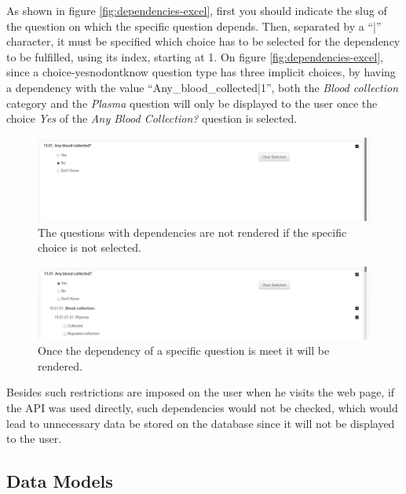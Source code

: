 As shown in figure \ref{fig:dependencies-excel}, first you should indicate the slug of the question on which the specific question depends.
Then, separated by a ``|'' character, it must be specified which choice has to be selected for the dependency to be fulfilled, using its index, starting at 1.
On figure \ref{fig:dependencies-excel}, since a choice-yesnodontknow question type has three implicit choices, by having a dependency with the value ``Any\_blood\_collected|1'', both the \textit{Blood collection} category and the \textit{Plasma} question will only be displayed to the user once the choice \textit{Yes} of the \textit{Any Blood Collection?} question is selected.

\begin{figure}[H]
    \center
    \includegraphics[width=0.75\linewidth]{dependencies-no}
    \caption{The questions with dependencies are not rendered if the specific choice is not selected.}
    \label{fig:dependencies-no}
\end{figure}

\begin{figure}[H]
    \center
    \includegraphics[width=0.75\linewidth]{dependencies-yes}
    \caption{Once the dependency of a specific question is meet it will be rendered.}
    \label{fig:dependencies-yes}
\end{figure}

Besides such restrictions are imposed on the user when he visits the web page, if the API was used directly, such dependencies would not be checked, which would lead to unnecessary data be stored on the database since it will not be displayed to the user.

\subsection{Data Models}

